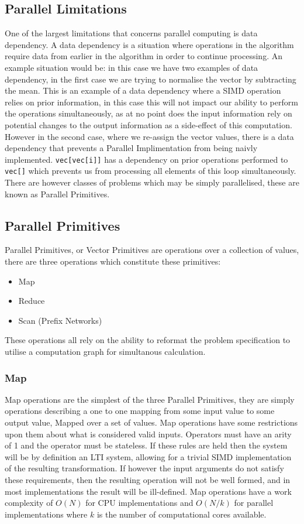 \subsection{Parallel Limitations} 
One of the largest limitations that concerns parallel computing is data dependency. A data
dependency is a situation where operations in the algorithm require data from earlier in the
algorithm in order to continue processing. An example situation would be:
 in this case we have two examples of data dependency, in
the first case we are trying to normalise the vector by subtracting the mean. This is an example of
a data dependency where a SIMD operation relies on prior information, in this case this will not
impact our ability to perform the operations simultaneously, as at no point does the input
information rely on potential changes to the output information as a side-effect of this
computation. However in the second case, where we re-assign the vector values, there is a data
dependency that prevents a Parallel Implimentation from being naivly implemented.
\lstinline{vec[vec[i]]} has a dependency on prior operations performed to \lstinline{vec[]} which
prevents us from processing all elements of this loop simultaneously. There are however classes of
problems which may be simply parallelised, these are known as Parallel Primitives.

\subsection{Parallel Primitives}
Parallel Primitives, or Vector Primitives are operations over a collection of values, there are
three operations which constitute these primitives:
\begin{itemize}
    \item Map
    \item Reduce
    \item Scan (Prefix Networks)
\end{itemize}
These operations all rely on the ability to reformat the problem specification to utilise a
computation graph for simultanous calculation.


\subsubsection{Map}

Map operations are the simplest of the three Parallel Primitives, they are simply operations
describing a one to one mapping from some input value to some output value, Mapped over a set of
values. Map operations have some restrictions upon them about what is
considered valid inputs. Operators must have an arity of 1 and the operator must be stateless. If
these rules are held then the system will be by definition an LTI system, allowing for a trivial
SIMD implementation of the resulting transformation. If however the input arguments do not satisfy
these requirements, then the resulting operation will not be well formed, and in most
implementations the result will be ill-defined. Map operations have a work complexity of $ O(N) $
for CPU implementations and $ O(N/k) $ for parallel implementations where $ k $ is the number of
computational cores available.


